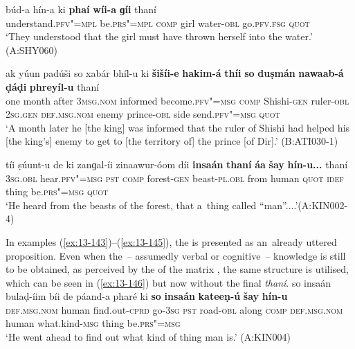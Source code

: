 \begin{exe}
\ex
\label{ex:13-143}
\gll \label{bkm:Ref190835538}búd-a hín-a ki \textbf{phaí} \textbf{wíi-a} \textbf{ ɡíi} thaní \\
understand.\textsc{pfv"=mpl} be.\textsc{prs"=mpl} \textsc{comp} girl water-\textsc{obl} go.\textsc{pfv.fsg} \textsc{quot} \\
\glt `They understood that the girl must have thrown herself into the water.' (A:SHY060)

\ex
\label{ex:13-144}
\gll ak yúun padúši so xabár bhíl-u  ki \textbf{šišíi-e} \textbf{hakim-á} \textbf{thíi} \textbf{so} \textbf{duṣmán} \textbf{nawaab-á} \textbf{ḍáḍi} \textbf{phreyíl-u} thaní \\
one month after \textsc{3msg.nom} informed become.\textsc{pfv"=msg}  \textsc{comp} Shishi-\textsc{gen} ruler-\textsc{obl } \textsc{2sg.gen} \textsc{def.msg.nom} enemy prince-\textsc{obl} side send.\textsc{pfv"=msg} \textsc{quot}  \\
\glt `A month later he [the king] was informed that the ruler of Shishi had helped his [the king's] enemy to get to [the territory of] the prince [of Dir].' (B:ATI030-1)

\ex
\label{ex:13-145}
\gll \label{bkm:Ref190835565}tíi ṣúunt-u de ki zanɡal-íi zinaawur-óom  díi \textbf{insaán} \textbf{thaní} \textbf{áa} \textbf{šay} \textbf{hín-u\textbf{...}} thaní \\
\textsc{3sg.obl} hear.\textsc{pfv"=msg} \textsc{pst} \textsc{comp} forest-\textsc{gen} beast-\textsc{pl.obl}  from human \textsc{quot} \textsc{idef} thing be.\textsc{prs"=msg} \textsc{quot} \\
\glt `He heard from the beasts of the forest, that a~thing called ``man''....'\newline (A:KIN002-4) 
\end{exe}

In examples (\ref{ex:13-143})--(\ref{ex:13-145}), the  is presented as an~already uttered proposition. Even when the~-- assumedly verbal or cognitive~-- knowledge is still to be obtained, as perceived by the  of the matrix , the same structure is utilised, which can be seen in (\ref{ex:13-146}) but now without the final \textit{thaní}. 
\ea
\label{ex:13-146}
\gll so insaán bulaḍ-íim bíi de páand-a pharé ki \textbf{so} \textbf{insaán} \textbf{kateeṇ-ú} \textbf{šay} \textbf{hín-u}\\
\textsc{def.msg.nom} human find.out-\textsc{cprd} go-\textsc{3sg} \textsc{pst} road-\textsc{obl}  along \textsc{comp} \textsc{def.msg.nom} human what.kind-\textsc{msg} thing be.\textsc{prs"=msg}\\
\glt `He went ahead to find out what kind of thing man is.' (A:KIN004) 
\z

